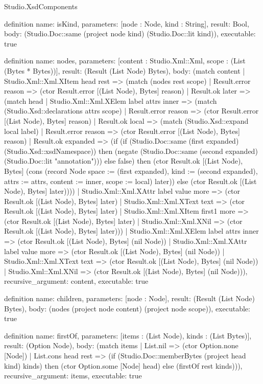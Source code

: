 \begin{lexlean}{Studio.XsdComponents}
\begin{semanticmodule}
definition{
  name: isKind,
  parameters: [node : Node, kind : String],
  result: Bool,
  body: (Studio.Doc::same (project node kind) (Studio.Doc::lit kind)),
  executable: true
}

definition{
  name: nodes,
  parameters: [content : Studio.Xml::Xml, scope : (List (Bytes * Bytes))],
  result: (Result (List Node) Bytes),
  body: (match content
    | Studio.Xml::Xml.XItem head rest => (match (nodes rest scope)
      | Result.error reason => (ctor Result.error [(List Node), Bytes] reason)
      | Result.ok later => (match head
        | Studio.Xml::Xml.XElem label attrs inner => (match (Studio.Xsd::declarations attrs scope)
          | Result.error reason => (ctor Result.error [(List Node), Bytes] reason)
          | Result.ok local => (match (Studio.Xsd::expand local label)
            | Result.error reason => (ctor Result.error [(List Node), Bytes] reason)
            | Result.ok expanded => (if (if (Studio.Doc::same (first expanded) (Studio.Xsd::xsdNamespace)) then (negate (Studio.Doc::same (second expanded) (Studio.Doc::lit "annotation"))) else false) then (ctor Result.ok [(List Node), Bytes] (cons (record Node {space := (first expanded), kind := (second expanded), attrs := attrs, content := inner, scope := local}) later)) else (ctor Result.ok [(List Node), Bytes] later))))
        | Studio.Xml::Xml.XAttr label value more => (ctor Result.ok [(List Node), Bytes] later)
        | Studio.Xml::Xml.XText text => (ctor Result.ok [(List Node), Bytes] later)
        | Studio.Xml::Xml.XItem first1 more => (ctor Result.ok [(List Node), Bytes] later)
        | Studio.Xml::Xml.XNil => (ctor Result.ok [(List Node), Bytes] later)))
    | Studio.Xml::Xml.XElem label attrs inner => (ctor Result.ok [(List Node), Bytes] (nil Node))
    | Studio.Xml::Xml.XAttr label value more => (ctor Result.ok [(List Node), Bytes] (nil Node))
    | Studio.Xml::Xml.XText text => (ctor Result.ok [(List Node), Bytes] (nil Node))
    | Studio.Xml::Xml.XNil => (ctor Result.ok [(List Node), Bytes] (nil Node))),
  recursive_argument: content,
  executable: true
}

definition{
  name: children,
  parameters: [node : Node],
  result: (Result (List Node) Bytes),
  body: (nodes (project node content) (project node scope)),
  executable: true
}

definition{
  name: firstOf,
  parameters: [items : (List Node), kinds : (List Bytes)],
  result: (Option Node),
  body: (match items
    | List.nil => (ctor Option.none [Node])
    | List.cons head rest => (if (Studio.Doc::memberBytes (project head kind) kinds) then (ctor Option.some [Node] head) else (firstOf rest kinds))),
  recursive_argument: items,
  executable: true
}


\end{semanticmodule}
\end{lexlean}
